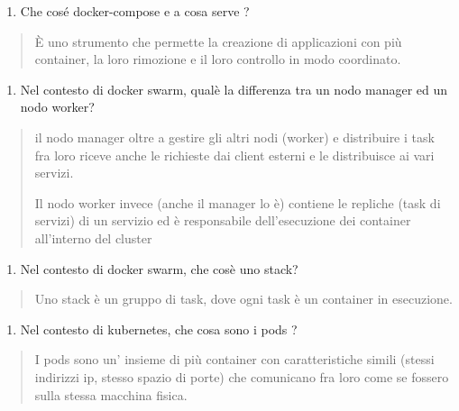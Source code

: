 \begin{enumerate}
\def\labelenumi{\arabic{enumi}.}
\setcounter{enumi}{13}
\item
  Che cos\textquotesingle é docker-compose e a cosa serve ?
\end{enumerate}

\begin{quote}
È uno strumento che permette la creazione di applicazioni con più
container, la loro rimozione e il loro controllo in modo coordinato.
\end{quote}

\begin{enumerate}
\def\labelenumi{\arabic{enumi}.}
\setcounter{enumi}{14}
\item
  Nel contesto di docker swarm, qual\textquotesingle è la differenza tra
  un nodo manager ed un nodo worker?
\end{enumerate}

\begin{quote}
il nodo manager oltre a gestire gli altri nodi (worker) e distribuire i
task fra loro riceve anche le richieste dai client esterni e le
distribuisce ai vari servizi.

Il nodo worker invece (anche il manager lo è) contiene le repliche (task
di servizi) di un servizio ed è responsabile dell'esecuzione dei
container all'interno del cluster
\end{quote}

\begin{enumerate}
\def\labelenumi{\arabic{enumi}.}
\setcounter{enumi}{15}
\item
  Nel contesto di docker swarm, che cos\textquotesingle è uno stack?
\end{enumerate}

\begin{quote}
Uno stack è un gruppo di task, dove ogni task è un container in
esecuzione.
\end{quote}

\begin{enumerate}
\def\labelenumi{\arabic{enumi}.}
\setcounter{enumi}{16}
\item
  Nel contesto di kubernetes, che cosa sono i pods ?
\end{enumerate}

\begin{quote}
I pods sono un' insieme di più container con caratteristiche simili
(stessi indirizzi ip, stesso spazio di porte) che comunicano fra loro
come se fossero sulla stessa macchina fisica.
\end{quote}


